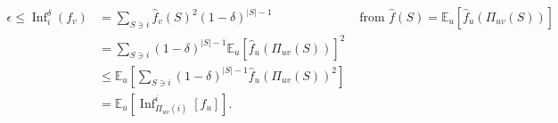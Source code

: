 \begin{remark}[Fact]
	\[
		\begin{aligned}
			\epsilon
			\leq \mathop{\mathrm{Inf}}\nolimits_i^\delta (f_v)
			 & = \sum_{S \ni i} \hat{f} _v(S)^2(1-\delta )^{\vert S \vert - 1}                                            & \text{ from } \hat{f} (S) = \mathbb{E}_{u}\left[\hat{f} _u(\Pi _{uv}(S)) \right] \\
			 & = \sum_{S \ni i} (1-\delta )^{\vert S \vert - 1}\mathbb{E}_{u}\left[\hat{f} _u(\Pi _{uv}(S)) \right] ^2                                                                                       \\
			 & \leq \mathbb{E}_{u}\left[\sum_{S \ni i} (1-\delta )^{\vert S \vert - 1} \hat{f} _u(\Pi _{uv}(S))^2 \right]                                                                                    \\
			 & = \mathbb{E}_{u}\left[\mathop{\mathrm{Inf}}\nolimits_{\Pi _{uv}(i)}^i[f_u] \right].
		\end{aligned}
	\]
\end{remark}
